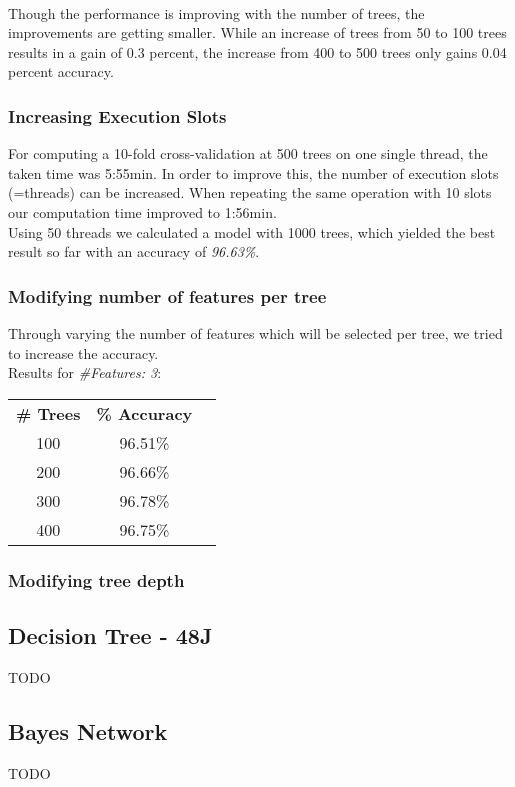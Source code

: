 \documentclass{sig-alternate-05-2015}
\begin{document}
\paragraph{}Though the performance is improving with the number of trees, the improvements are getting smaller. While an increase of trees from 50 to 100 trees results in a gain of 0.3 percent, the increase from 400 to 500 trees only gains 0.04 percent accuracy. 
\subsubsection{Increasing Execution Slots}For computing a 10-fold cross-validation at 500 trees on one single thread, the taken time was 5:55min. In order to improve this, the number of execution slots (=threads) can be increased. When repeating the same operation with 10 slots our computation time improved to 1:56min. \\
Using 50 threads we calculated a model with 1000 trees, which yielded the best result so far with an accuracy of \emph{96.63\%}. 
\subsubsection{Modifying number of features per tree}
Through varying the number of features which will be selected per tree, we tried to increase the accuracy. \\
Results for \emph{\#Features: 3}:\\
\begin{tabular}{ c | c | c }
\textbf{\# Trees} & \textbf{\% Accuracy} \\
100 & 96.51\% \\
200 & 96.66\% \\
300 & 96.78\% \\
400 & 96.75\% \\
\end{tabular}

\subsubsection{Modifying tree depth}


\subsection{Decision Tree - 48J}
TODO\\
\subsection{Bayes Network}
TODO\\
\end{document}
